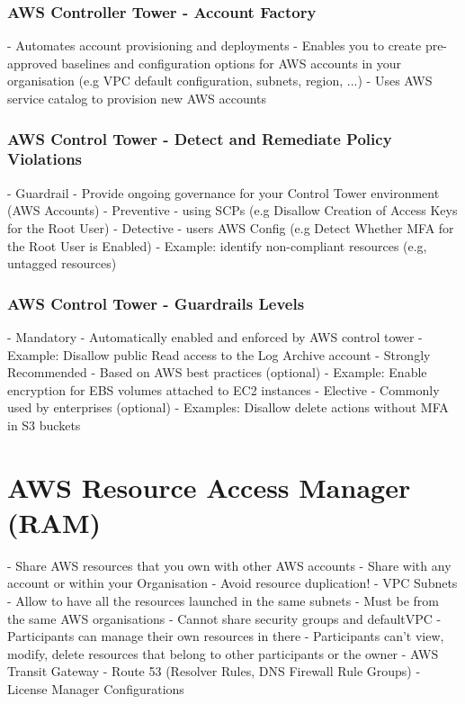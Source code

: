\documentclass[11pt]{book}
\begin{document}
    \subsubsection{AWS Controller Tower - Account Factory}
    - Automates account provisioning and deployments
    - Enables you to create pre-approved baselines and configuration options for AWS accounts in your organisation (e.g VPC default configuration, subnets, region, ...)
    - Uses AWS service catalog to provision new AWS accounts

    \subsubsection{AWS Control Tower - Detect and Remediate Policy Violations}
    - Guardrail
    - Provide ongoing governance for your Control Tower environment (AWS Accounts)
    - Preventive - using SCPs (e.g Disallow Creation of Access Keys for the Root User)
    - Detective - users AWS Config (e.g Detect Whether MFA for the Root User is Enabled)
    - Example: identify non-compliant resources (e.g, untagged resources)


    \subsubsection{AWS Control Tower - Guardrails Levels}
    - Mandatory
    - Automatically enabled and enforced by AWS control tower
    - Example: Disallow public Read access to the Log Archive account
    - Strongly Recommended
    - Based on AWS best practices (optional)
    - Example: Enable encryption for EBS volumes attached to EC2 instances
    - Elective
    - Commonly used by enterprises (optional)
    - Examples: Disallow delete actions without MFA in S3 buckets


    \section{AWS Resource Access Manager (RAM)}
    - Share AWS resources that you own with other AWS accounts
    - Share with any account or within your Organisation
    - Avoid resource duplication!
    - VPC Subnets
    - Allow to have all the resources launched in the same subnets
    - Must be from the same AWS organisations
    - Cannot share security groups and defaultVPC
    - Participants can manage their own resources in there
    - Participants can't view, modify, delete resources that belong to other participants or the owner
    - AWS Transit Gateway
    - Route 53 (Resolver Rules, DNS Firewall Rule Groups)
    - License Manager Configurations
\end{document}

